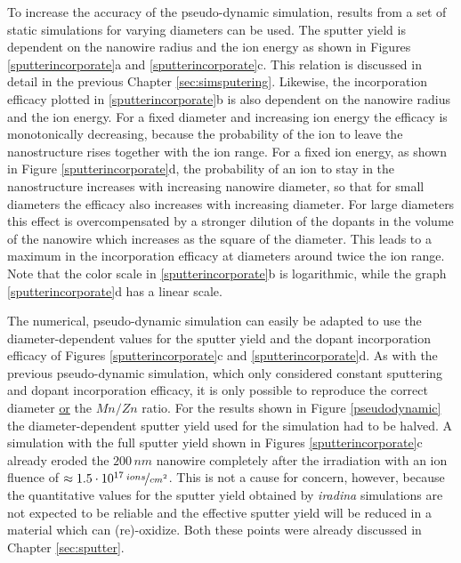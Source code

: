 To increase the accuracy of the pseudo-dynamic simulation, results from a set of static simulations for varying diameters can be used. The sputter yield is dependent on the nanowire radius and the ion energy as shown in Figures \ref{sputterincorporate}a and \ref{sputterincorporate}c. This relation is discussed in detail in the previous Chapter \ref{sec:simsputering}. Likewise, the incorporation efficacy plotted in \ref{sputterincorporate}b is also dependent on the nanowire radius and the ion energy. For a fixed diameter and increasing ion energy the efficacy is monotonically decreasing, because the probability of the ion to leave the nanostructure rises together with the ion range. For a fixed ion energy, as shown in Figure \ref{sputterincorporate}d, the probability of an ion to stay in the nanostructure increases with increasing nanowire diameter, so that for small diameters the efficacy also increases with increasing diameter. For large diameters this effect is overcompensated by a stronger dilution of the dopants in the volume of the nanowire which increases as the square of the diameter. This leads to a maximum in the incorporation efficacy at diameters around twice the ion range. Note that the color scale in \ref{sputterincorporate}b is logarithmic, while the graph \ref{sputterincorporate}d has a linear scale.



The numerical, pseudo-dynamic simulation can easily be adapted to use the diameter-dependent values for the sputter yield and the dopant incorporation efficacy of Figures \ref{sputterincorporate}c and \ref{sputterincorporate}d. As with the previous pseudo-dynamic simulation, which only considered constant sputtering and dopant incorporation efficacy, it is only possible to reproduce the correct diameter \underline{or} the $Mn/Zn$ ratio. For the results shown in Figure \ref{pseudodynamic} the diameter-dependent sputter yield used for the simulation had to be halved. A simulation with the full sputter yield shown in Figures \ref{sputterincorporate}c already eroded the $200\,nm$ nanowire completely after the irradiation with an ion fluence of $\approx 1.5\cdot 10^{17}\,\nicefrac{ions}{cm^2}$. This is not a cause for concern, however, because the quantitative values for the sputter yield obtained by \emph{iradina} simulations are not expected to be reliable and the effective sputter yield will be reduced in a material which can (re)-oxidize. Both these points were already discussed in Chapter \ref{sec:sputter}.

